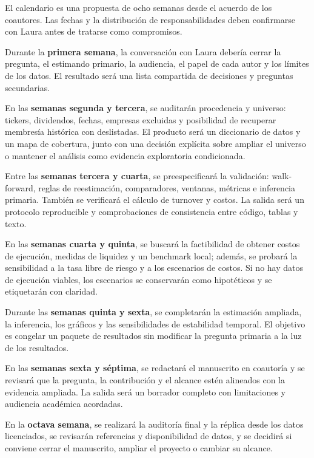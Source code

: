 \documentclass[11pt]{article}
\begin{document}
El calendario es una propuesta de ocho semanas desde el acuerdo de los
coautores. Las fechas y la distribución de responsabilidades deben confirmarse
con Laura antes de tratarse como compromisos.

Durante la \textbf{primera semana}, la conversación con Laura debería cerrar la
pregunta, el estimando primario, la audiencia, el papel de cada autor y los
límites de los datos. El resultado será una lista compartida de decisiones y
preguntas secundarias.

En las \textbf{semanas segunda y tercera}, se auditarán procedencia y universo:
tickers, dividendos, fechas, empresas excluidas y posibilidad de recuperar
membresía histórica con deslistadas. El producto será un diccionario de datos
y un mapa de cobertura, junto con una decisión explícita sobre ampliar el
universo o mantener el análisis como evidencia exploratoria condicionada.

Entre las \textbf{semanas tercera y cuarta}, se preespecificará la validación:
walk-forward, reglas de reestimación, comparadores, ventanas, métricas e
inferencia primaria. También se verificará el cálculo de turnover y costos.
La salida será un protocolo reproducible y comprobaciones de consistencia
entre código, tablas y texto.

En las \textbf{semanas cuarta y quinta}, se buscará la factibilidad de obtener
costos de ejecución, medidas de liquidez y un benchmark local; además, se
probará la sensibilidad a la tasa libre de riesgo y a los escenarios de
costos. Si no hay datos de ejecución viables, los escenarios se conservarán
como hipotéticos y se etiquetarán con claridad.

Durante las \textbf{semanas quinta y sexta}, se completarán la estimación ampliada,
la inferencia, los gráficos y las sensibilidades de estabilidad temporal.
El objetivo es congelar un paquete de resultados sin modificar la pregunta
primaria a la luz de los resultados.

En las \textbf{semanas sexta y séptima}, se redactará el manuscrito en
coautoría y se revisará que la pregunta, la contribución y el alcance estén
alineados con la evidencia ampliada. La salida será un borrador completo con
limitaciones y audiencia académica acordadas.

En la \textbf{octava semana}, se realizará la auditoría final y la réplica desde
los datos licenciados, se revisarán referencias y disponibilidad de datos, y
se decidirá si conviene cerrar el manuscrito, ampliar el proyecto o cambiar
su alcance.
\end{document}

